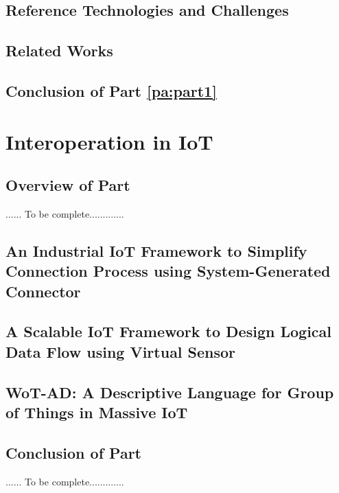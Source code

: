\documentclass[a4paper,10pt,twoside]{ThesisStyle}
\begin{document}
\chapter{Reference Technologies and Challenges}
\label{ch:reference_technologies}
 

\chapter{Related Works}
\label{ch:performance_evaluation}


\chapter*{Conclusion of Part \ref{pa:part1}}


\part{Interoperation in IoT}
\label{pa:part2}
\chapter*{Overview of Part \ref{pa:part2}}
...... To be complete.............

\chapter{An Industrial IoT Framework to Simplify Connection Process using System-Generated Connector} 
\label{ch:connector} 


\chapter{A Scalable IoT Framework to Design Logical Data Flow using Virtual Sensor} \label{ch:VSF} 


\chapter{WoT-AD: A Descriptive Language for Group of Things in Massive IoT} 
\label{ch:Wot-AD}



\chapter*{Conclusion of Part \ref{pa:part2}}
...... To be complete.............
\end{document}
